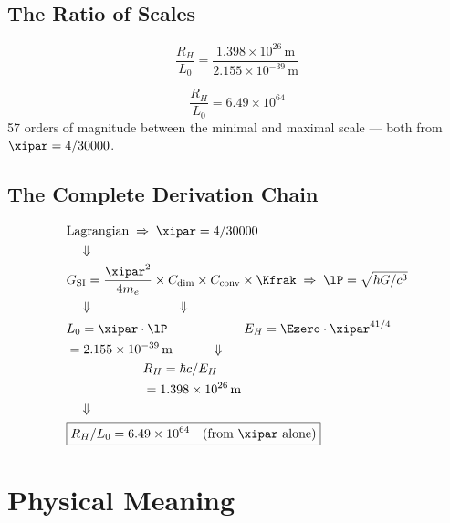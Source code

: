 \subsection{The Ratio of Scales}

\begin{equation}
	\frac{R_H}{L_0} = \frac{1{.}398 \times 10^{26}\,\text{m}}{2{.}155 \times 10^{-39}\,\text{m}}
\end{equation}

\begin{keyresult}
\begin{equation}
	\boxed{\frac{R_H}{L_0} = 6{.}49 \times 10^{64}}
\end{equation}
57 orders of magnitude between the minimal and maximal scale — both from $\xipar = 4/30000$.
\end{keyresult}

\subsection{The Complete Derivation Chain}

\begin{keyresult}
\begin{align}
	&\text{Lagrangian} \;\Rightarrow\; \xipar = 4/30000 \notag \\
	&\quad\Downarrow \notag \\
	&G_{\text{SI}} = \frac{\xipar^2}{4m_e} \times C_{\text{dim}} \times C_{\text{conv}} \times \Kfrak \;\Rightarrow\; \lP = \sqrt{\hbar G/c^3} \notag \\
	&\quad\Downarrow\qquad\qquad\qquad\quad\Downarrow \notag \\
	&L_0 = \xipar \cdot \lP \qquad\qquad\qquad E_H = \Ezero \cdot \xipar^{41/4} \notag \\
	&= 2{.}155 \times 10^{-39}\,\text{m} \qquad\quad\Downarrow \notag \\
	&\qquad\qquad\qquad R_H = \hbar c/E_H \notag \\
	&\qquad\qquad\qquad = 1{.}398 \times 10^{26}\,\text{m} \notag \\
	&\quad\Downarrow \notag \\
	&\boxed{R_H/L_0 = 6{.}49 \times 10^{64} \quad \text{(from } \xipar \text{ alone)}}
\end{align}
\end{keyresult}

\section{Physical Meaning}

